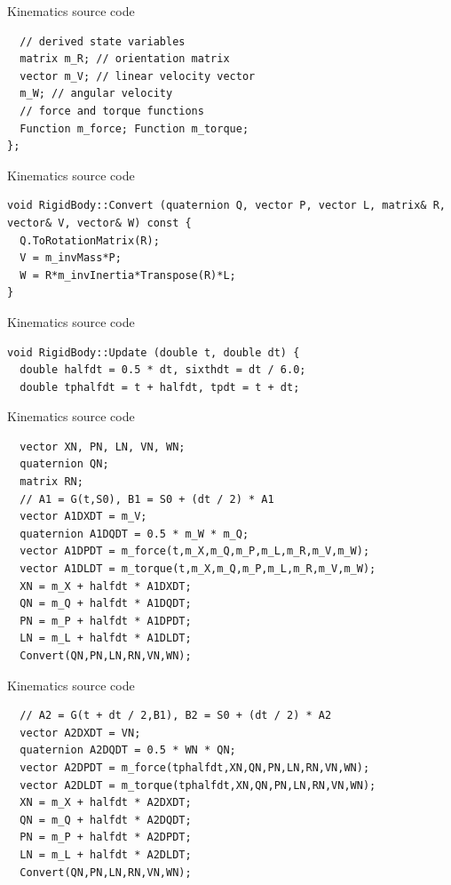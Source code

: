 \documentclass{beamer}
\begin{document}
\begin{frame}[fragile]{Kinematics source code}
\begin{lstlisting}
  // derived state variables 
  matrix m_R; // orientation matrix 
  vector m_V; // linear velocity vector 
  m_W; // angular velocity
  // force and torque functions 
  Function m_force; Function m_torque;
};
\end{lstlisting}
\end{frame}

\begin{frame}[fragile]{Kinematics source code}
\begin{lstlisting}
void RigidBody::Convert (quaternion Q, vector P, vector L, matrix& R, vector& V, vector& W) const { 
  Q.ToRotationMatrix(R); 
  V = m_invMass*P; 
  W = R*m_invInertia*Transpose(R)*L; 
}
\end{lstlisting}
\end{frame}

\begin{frame}[fragile]{Kinematics source code}
\begin{lstlisting}
void RigidBody::Update (double t, double dt) { 
  double halfdt = 0.5 * dt, sixthdt = dt / 6.0;
  double tphalfdt = t + halfdt, tpdt = t + dt;
\end{lstlisting}
\end{frame}

\begin{frame}[fragile]{Kinematics source code}
\begin{lstlisting}
  vector XN, PN, LN, VN, WN; 
  quaternion QN; 
  matrix RN;
  // A1 = G(t,S0), B1 = S0 + (dt / 2) * A1 
  vector A1DXDT = m_V; 
  quaternion A1DQDT = 0.5 * m_W * m_Q; 
  vector A1DPDT = m_force(t,m_X,m_Q,m_P,m_L,m_R,m_V,m_W); 
  vector A1DLDT = m_torque(t,m_X,m_Q,m_P,m_L,m_R,m_V,m_W); 
  XN = m_X + halfdt * A1DXDT; 
  QN = m_Q + halfdt * A1DQDT; 
  PN = m_P + halfdt * A1DPDT; 
  LN = m_L + halfdt * A1DLDT; 
  Convert(QN,PN,LN,RN,VN,WN);
\end{lstlisting}
\end{frame}

\begin{frame}[fragile]{Kinematics source code}
\begin{lstlisting}
  // A2 = G(t + dt / 2,B1), B2 = S0 + (dt / 2) * A2 
  vector A2DXDT = VN; 
  quaternion A2DQDT = 0.5 * WN * QN; 
  vector A2DPDT = m_force(tphalfdt,XN,QN,PN,LN,RN,VN,WN); 
  vector A2DLDT = m_torque(tphalfdt,XN,QN,PN,LN,RN,VN,WN); 
  XN = m_X + halfdt * A2DXDT; 
  QN = m_Q + halfdt * A2DQDT; 
  PN = m_P + halfdt * A2DPDT; 
  LN = m_L + halfdt * A2DLDT; 
  Convert(QN,PN,LN,RN,VN,WN);
\end{lstlisting}
\end{frame}
\end{document}
